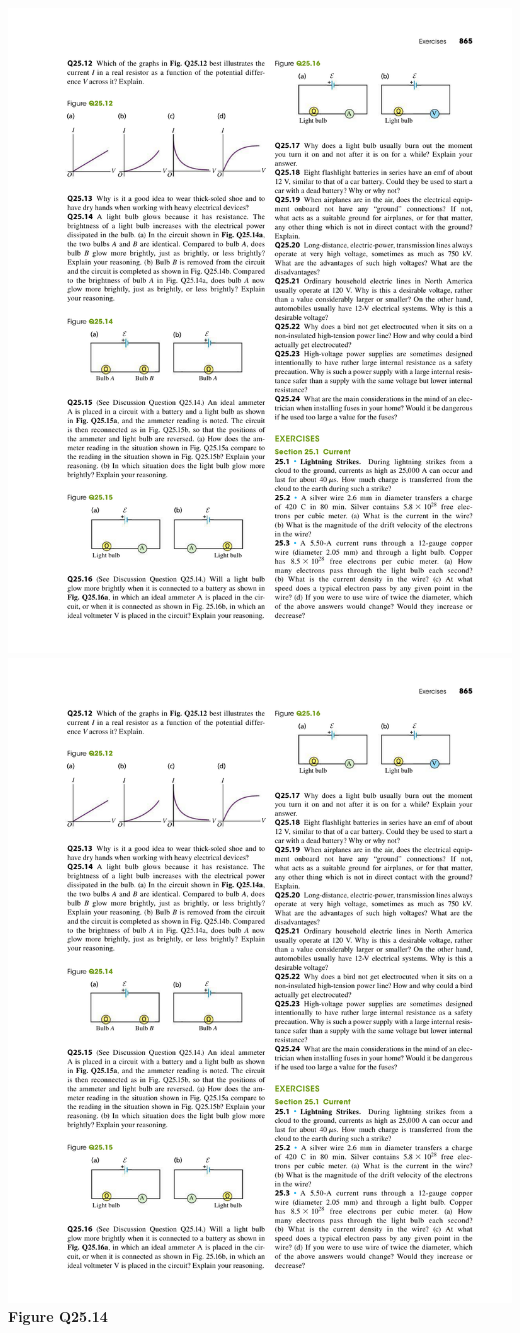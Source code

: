 \documentclass[11pt]{article}
\begin{document}
\begin{minipage}{0.2\textwidth}
\center \includegraphics{Q25-14a} \\
\center \includegraphics{Q25-14b}
\center \textbf{Figure Q25.14}
\end{minipage}
\end{document}
